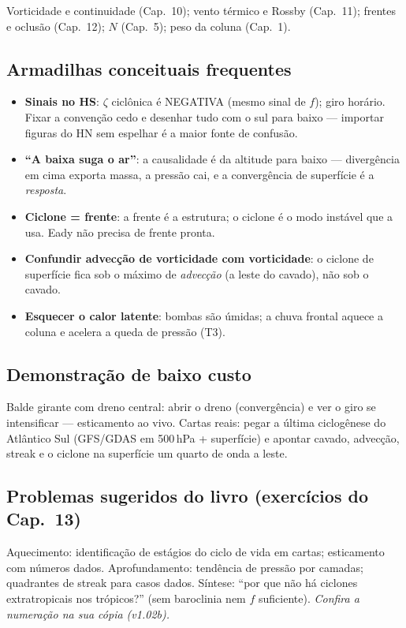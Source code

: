 Vorticidade e continuidade (Cap.~10); vento térmico e Rossby (Cap.~11);
frentes e oclusão (Cap.~12); $N$ (Cap.~5); peso da coluna (Cap.~1).

\subsection*{Armadilhas conceituais frequentes}

\begin{itemize}
  \item \textbf{Sinais no HS}: $\zeta$ ciclônica é NEGATIVA (mesmo
        sinal de $f$); giro horário. Fixar a convenção cedo e desenhar
        tudo com o sul para baixo — importar figuras do HN sem espelhar
        é a maior fonte de confusão.
  \item \textbf{``A baixa suga o ar''}: a causalidade é da altitude
        para baixo — divergência em cima exporta massa, a pressão cai,
        e a convergência de superfície é a \emph{resposta}.
  \item \textbf{Ciclone = frente}: a frente é a estrutura; o ciclone é
        o modo instável que a usa. Eady não precisa de frente pronta.
  \item \textbf{Confundir advecção de vorticidade com vorticidade}: o
        ciclone de superfície fica sob o máximo de \emph{advecção} (a
        leste do cavado), não sob o cavado.
  \item \textbf{Esquecer o calor latente}: bombas são úmidas; a chuva
        frontal aquece a coluna e acelera a queda de pressão (T3).
\end{itemize}

\subsection*{Demonstração de baixo custo}

Balde girante com dreno central: abrir o dreno (convergência) e ver o
giro se intensificar — esticamento ao vivo. Cartas reais: pegar a
última ciclogênese do Atlântico Sul (GFS/GDAS em 500\,hPa +
superfície) e apontar cavado, advecção, streak e o ciclone na
superfície um quarto de onda a leste.

\subsection*{Problemas sugeridos do livro (exercícios do Cap.~13)}

Aquecimento: identificação de estágios do ciclo de vida em cartas;
esticamento com números dados. Aprofundamento: tendência de pressão por
camadas; quadrantes de streak para casos dados. Síntese: ``por que não
há ciclones extratropicais nos trópicos?'' (sem baroclinia nem $f$
suficiente). \emph{Confira a numeração na sua cópia (v1.02b).}

